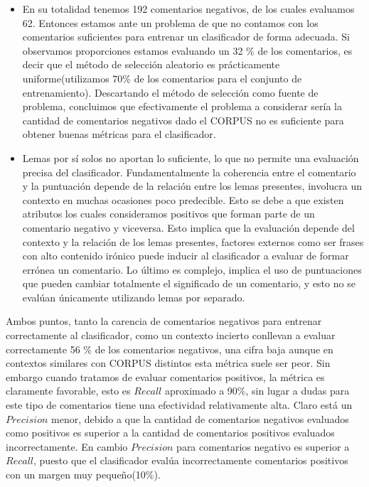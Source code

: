 \documentclass[12pt]{article}
\begin{document}
\begin{itemize}
  \item En su totalidad tenemos 192 comentarios negativos, de los cuales evaluamos 62. Entonces estamos ante un problema de que no contamos con los comentarios suficientes para entrenar un clasificador de forma adecuada. Si observamos proporciones estamos evaluando un 32 \% de los comentarios, es decir que el método de selección aleatorio es prácticamente uniforme(utilizamos 70\% de los comentarios para el conjunto de entrenamiento). Descartando el método de selección como fuente de problema, concluimos que efectivamente el problema a considerar sería la cantidad de comentarios negativos dado el CORPUS no es suficiente para obtener buenas métricas para el clasificador.
  \item Lemas por sí solos no aportan lo suficiente, lo que no permite una evaluación precisa del clasificador. Fundamentalmente la coherencia entre el comentario y la puntuación depende de la relación entre los lemas presentes, involucra un contexto en muchas ocasiones poco predecible. Esto se debe a que existen atributos los cuales consideramos positivos que forman parte de un comentario negativo y viceversa. Esto implica que la evaluación depende del contexto y la relación de los lemas presentes, factores externos como ser frases con alto contenido irónico puede inducir al clasificador a evaluar de formar errónea un comentario. Lo último es complejo, implica el uso de puntuaciones que pueden cambiar totalmente el significado de un comentario, y esto no se evalúan únicamente utilizando lemas por separado.
\end{itemize}
Ambos puntos, tanto la carencia de comentarios negativos para entrenar correctamente al clasificador, como un contexto incierto conllevan a evaluar correctamente 56 \% de los comentarios negativos, una cifra baja aunque en contextos similares con CORPUS distintos esta métrica suele ser peor.
Sin embargo cuando tratamos de evaluar comentarios positivos, la métrica es claramente favorable, esto es $Recall$ aproximado a 90\%, sin lugar a dudas para este tipo de comentarios tiene una efectividad relativamente alta. Claro está un $Precision$ menor, debido a que la cantidad de comentarios negativos evaluados como positivos es superior a la cantidad de comentarios positivos evaluados incorrectamente. En cambio $Precision$ para comentarios negativo es superior a $Recall$, puesto que el clasificador evalúa incorrectamente comentarios positivos con un margen muy pequeño(10\%).
\end{document}
